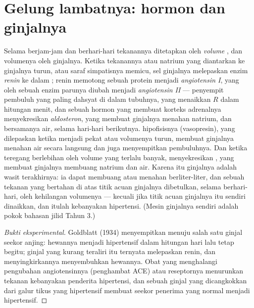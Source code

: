 \section{Gelung lambatnya: hormon dan ginjalnya}

\begin{proposition}\label{prop:b2:blood-pressure:raas}
Selama berjam-jam dan berhari-hari tekanannya ditetapkan oleh
\emph{volume }, dan volumenya oleh ginjalnya. Ketika tekanannya
atau natrium yang diantarkan ke ginjalnya turun, atau saraf simpatisnya
memicu, sel  ginjalnya melepaskan enzim \emph{renin} ke dalam
; renin memotong sebuah protein  menjadi
\emph{angiotensin I}, yang oleh sebuah enzim  parunya diubah
menjadi \emph{angiotensin II} --- penyempit pembuluh yang paling
dahsyat di dalam tubuhnya, yang menaikkan $R$ dalam hitungan menit, dan
sebuah hormon yang membuat korteks adrenalnya menyekresikan
\emph{aldosteron}, yang membuat ginjalnya menahan natrium, dan
bersamanya air, selama hari-hari berikutnya. \emph{}
hipofisisnya (vasopresin), yang dilepaskan ketika  menjadi
pekat atau volumenya turun, membuat ginjalnya menahan air secara
langsung dan juga menyempitkan pembuluhnya. Dan ketika 
teregang berlebihan oleh volume yang terlalu banyak, 
menyekresikan \emph{}, yang membuat ginjalnya
membuang natrium dan air. Karena itu ginjalnya adalah wasit
terakhirnya: ia dapat membuang atau menahan berliter-liter, dan sebuah
tekanan yang bertahan di atas titik acuan ginjalnya dibetulkan, selama
berhari-hari, oleh kehilangan volumenya --- kecuali jika titik acuan
ginjalnya itu sendiri dinaikkan, dan itulah kebanyakan hipertensi.
(Mesin ginjalnya sendiri adalah pokok bahasan jilid Tahun 3.)
\end{proposition}
\begin{proof}[Bukti eksperimental]
Goldblatt (1934) menyempitkan  menuju salah satu ginjal seekor
anjing: hewannya menjadi hipertensif dalam hitungan hari lalu tetap
begitu; ginjal yang kurang teraliri itu ternyata melepaskan renin, dan
menyingkirkannya menyembuhkan hewannya. Obat yang menghalangi
pengubahan angiotensinnya (penghambat ACE) atau reseptornya menurunkan
tekanan kebanyakan penderita hipertensi, dan sebuah ginjal yang
dicangkokkan dari galur tikus yang hipertensif membuat seekor penerima
yang normal menjadi hipertensif.
\end{proof}

